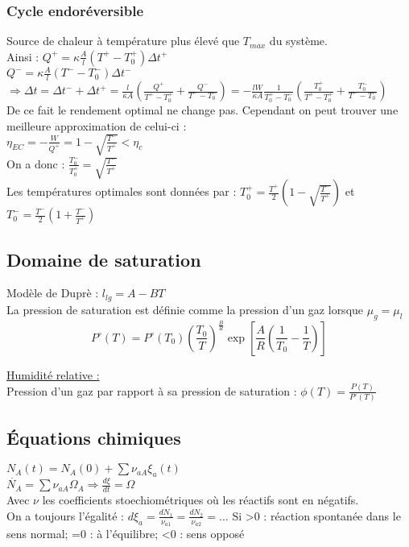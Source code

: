 \documentclass[../main.tex]{subfiles}
\begin{document}
\subsubsection{Cycle endoréversible}
Source de chaleur à température plus élevé que $T_{max}$ du système.\\
Ainsi : $Q^+ = \kappa \frac{A}{l}(T^+-T_0^+) \Delta t^+$\\
$Q^- = \kappa \frac{A}{l}(T^- - T_0^-) \Delta t^-$
$\Rightarrow \Delta t = \Delta t^- + \Delta t^+ = \frac{l}{\kappa A} (\frac{Q^+}{T^+-T_0^+} + \frac{Q^-}{T^--T_0^-}) = -\frac{lW}{\kappa A} \frac{1}{T_0^+-T_0^-} (\frac{T_0^+}{T^+-T_0^+} + \frac{T_0^-}{T^--T_0^-})$\\
De ce fait le rendement optimal ne change pas. Cependant on peut trouver une meilleure approximation de celui-ci :\\
$\eta_{EC} = -\frac{W}{Q^+} = 1-\sqrt{\frac{T^-}{T^+}}< \eta_c$\\
On a donc : $\frac{T_0^-}{T_0^+} = \sqrt{\frac{T^-}{T^+}}$\\
Les températures optimales sont données par : $T_0^+ = \frac{T^+}{2}(1-\sqrt{\frac{T^-}{T^+}})$ et $T_0^- = \frac{T^-}{2}(1+\frac{T^-}{T^+})$\\

\subsection{Domaine de saturation}
Modèle de Duprè : $l_{lg} = A-BT$\\
La pression de saturation est définie comme la pression d'un gaz lorsque $\mu_g = \mu_l$\\
\begin{equation}
    P^{\circ}(T)= P^{\circ}(T_0) (\frac{T_0}{T})^{\frac{B}{R}} \exp{[\frac{A}{R}(\frac{1}{T_0}-\frac{1}{T})]}
\end{equation}


\quad \underline{Humidité relative :}\\
Pression d'un gaz par rapport à sa pression de saturation : $\phi(T) = \frac{P(T)}{P^{\circ}(T)}$\\

\subsection{Équations chimiques}
$N_A(t) = N_A(0) + \sum \nu_{aA} \xi_a(t)$\\
$\dot{N_A} = \sum \nu_{aA} \Omega_A \Rightarrow \frac{d\xi}{dt} = \Omega$\\
Avec $\nu$ les coefficients stoechiométriques où les réactifs sont en négatifs.\\
On a toujours l'égalité : $d\xi_a = \frac{dN_1}{\nu_{a1}} = \frac{dN_2}{\nu_{a2}} = \dots$ Si >0 : réaction spontanée dans le sens normal; =0 : à l'équilibre; <0 : sens opposé\\
\end{document}
